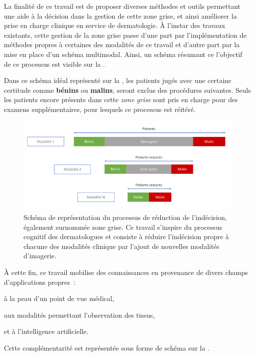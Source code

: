 La finalité de ce travail est de proposer diverses méthodes et outils permettant une aide à la décision dans la gestion de cette zone grise, et ainsi améliorer la prise en charge clinique en service de dermatologie. À l'instar des travaux existants, cette gestion de la zone grise passe d'une part par l'implémentation de méthodes propres à certaines des modalités de ce travail et d'autre part par la mise en place d'un schéma multimodal. Ainsi, un schéma résumant ce l'objectif de ce processus est visible sur la .\par
\clearpage

Dans ce schéma idéal représenté sur la , les patients jugés avec une certaine certitude comme \textbf{bénins} ou \textbf{malins}, seront exclus des procédures suivantes. Seuls les patients encore présents dans cette \textit{zone grise} sont pris en charge pour des examens supplémentaires, pour lesquels ce processus est réitéré.\par 

\begin{figure}[H]
    \centering
    \includegraphics[width=\linewidth]{contents/i_introduction/resources/scheme_reduce_indecision.pdf}
    \caption{Schéma de représentation du processus de réduction de l'indécision, également surnommée zone grise. Ce travail s'inspire du processus cognitif des dermatologues et consiste à réduire l'indécision propre à chacune des modalités clinique par l'ajout de nouvelles modalités d'imagerie.}
    \label{fig:scheme_reduce_indecision}
\end{figure}\par

À cette fin, ce travail mobilise des connaissances en provenance de divers champs d'applications propres~:
\begin{inlinerate}
    \item à la peau d'un point de vue médical, 
    \item aux modalités permettant l'observation des tissus,
    \item et à l'intelligence artificielle.
\end{inlinerate} Cette complémentarité est représentée sous forme de schéma sur la .\par

